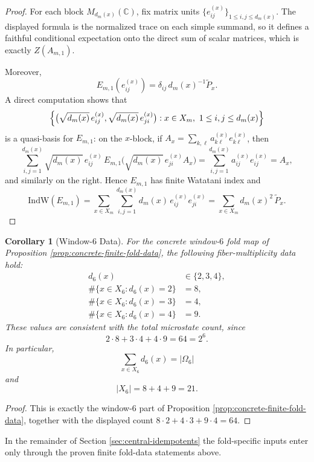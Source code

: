 \documentclass[12pt,a4paper]{article}
\theoremstyle{plain}
\newtheorem{corollary}[theorem]{Corollary}
\theoremstyle{definition}
\numberwithin{equation}{section}
\newcommand{\CC}{\mathbb{C}}
\newcommand{\abs}[1]{\lvert #1\rvert}
\begin{document}
\begin{proof}
For each block \(M_{d_m(x)}(\CC)\), fix matrix units \(\{e_{ij}^{(x)}\}_{1\le i,j\le d_m(x)}\). The displayed formula is the normalized trace on each simple summand, so it defines a faithful conditional expectation onto the direct sum of scalar matrices, which is exactly \(Z(A_{m,1})\).

Moreover,
\[
E_{m,1}(e_{ij}^{(x)})=\delta_{ij}\,d_m(x)^{-1}\widetilde P_x.
\]
A direct computation shows that
\[
\Bigl\{\bigl(\sqrt{d_m(x)}\,e_{ij}^{(x)},\sqrt{d_m(x)}\,e_{ji}^{(x)}\bigr): x\in X_m,\ 1\le i,j\le d_m(x)\Bigr\}
\]
is a quasi-basis for \(E_{m,1}\): on the \(x\)-block, if \(A_x=\sum_{k,\ell}a_{k\ell}^{(x)}e_{k\ell}^{(x)}\), then
\[
\sum_{i,j=1}^{d_m(x)}\sqrt{d_m(x)}\,e_{ij}^{(x)}
\,E_{m,1}\!\bigl(\sqrt{d_m(x)}\,e_{ji}^{(x)}A_x\bigr)
=
\sum_{i,j=1}^{d_m(x)}a_{ij}^{(x)}e_{ij}^{(x)}
=
A_x,
\]
and similarly on the right. Hence \(E_{m,1}\) has finite Watatani index and
\[
\mathrm{IndW}(E_{m,1})
=
\sum_{x\in X_m}\sum_{i,j=1}^{d_m(x)}d_m(x)\,e_{ij}^{(x)}e_{ji}^{(x)}
=
\sum_{x\in X_m}d_m(x)^2\,\widetilde P_x.
\]
\end{proof}

\begin{corollary}[Window-\texorpdfstring{$6$}{6} Data]\label{cor:fold-bin-m6-fiber-hist}
For the concrete window-\(6\) fold map of Proposition \ref{prop:concrete-finite-fold-data}, the following fiber-multiplicity data hold:
\[
\begin{aligned}
d_6(x)&\in\{2,3,4\},\\
\#\{x\in X_6:d_6(x)=2\}&=8,\\
\#\{x\in X_6:d_6(x)=3\}&=4,\\
\#\{x\in X_6:d_6(x)=4\}&=9.
\end{aligned}
\]
These values are consistent with the total microstate count, since
\[
2\cdot 8+3\cdot 4+4\cdot 9=64=2^6.
\]
In particular,
\[
\sum_{x\in X_6}d_6(x)=|\Omega_6|
\]
and
\[
\abs{X_6}=8+4+9=21.
\]
\end{corollary}
\begin{proof}
This is exactly the window-\(6\) part of Proposition \ref{prop:concrete-finite-fold-data}, together with the displayed count \(8\cdot2+4\cdot3+9\cdot4=64\).
\end{proof}

In the remainder of Section \ref{sec:central-idempotents} the fold-specific inputs enter only through the proven finite fold-data statements above.
\end{document}
